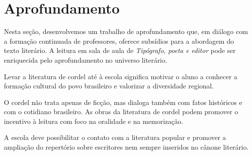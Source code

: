 \documentclass[12pt]{extarticle}
\begin{document}

\section{Aprofundamento}



Nesta seção, desenvolvemos um trabalho de aprofundamento que, em diálogo com
a formação continuada de professores, oferece subsídios para a abordagem do
texto literário. A leitura em sala de aula de \emph{Tipógrafo, poeta e editor}
pode ser enriquecida pelo aprofundamento no universo literário.

Levar a literatura de cordel até à escola significa motivar o aluno a conhecer
a formação cultural do povo brasileiro e valorizar a diversidade regional.

O cordel não trata apenas de ficção, mas dialoga também com fatos históricos
e com o cotidiano brasileiro. As obras da literatura de cordel podem promover
o incentivo à leitura com foco na oralidade e na memorização.

A escola deve possibilitar o contato com a literatura popular e promover
a ampliação do repertório sobre escritores nem sempre inseridos no cânone
literário.
\end{document}
